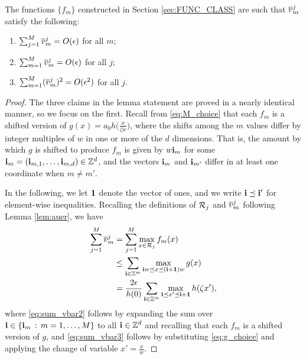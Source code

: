 \documentclass[english,onecolumn,final,11pt]{IEEEtran} %
\begin{document}
\begin{lemma} \label{lem:vbar_sums}
	The functions $\{f_m\}$ constructed in Section \ref{sec:FUNC_CLASS} are such that $\overline{v}_m^j$ satisfy the following:
	\begin{enumerate}
		\item $\sum_{j=1}^M \overline{v}_m^j = O(\epsilon)$ for all $m$;
		\item $\sum_{m=1}^M \overline{v}_m^j = O(\epsilon)$ for all $j$;
		\item $\sum_{m=1}^M (\overline{v}_m^j)^2 = O(\epsilon^2)$ for all $j$.
	\end{enumerate}
\end{lemma}
\begin{proof}
    The three claims in the lemma statement are proved in a nearly identical manner, so we focus on the first.  Recall from \eqref{eq:M_choice} that each $f_m$ is a shifted version of $g(x) = a_0 h\big(\frac{x}{\zeta w}\big)$, where the shifts among the $m$ values differ by integer multiples of $w$ in one or more of the $d$ dimensions.  That is, the amount by which $g$ is shifted to produce $f_m$ is given by $w \mathbf{i}_m$ for some $\mathbf{i}_m = (\mathbf{i}_{m,1},\dotsc,\mathbf{i}_{m,d}) \in \mathbb{Z}^d$, and the vectors $\mathbf{i}_{m}$ and $\mathbf{i}_{m'}$ differ in at least one coordinate when $m \ne m'$.  
    
    In the following, we let $\mathbf{1}$ denote the vector of ones, and we write $\mathbf{i} \preceq \mathbf{i}'$ for element-wise inequalities. Recalling the definitions of $\mathcal{R}_j$ and $\overline{v}_m^j$ following Lemma \ref{lem:auer}, we have
    \begin{align}
        \sum_{j=1}^M \overline{v}_m^j 
            &= \sum_{j=1}^M \max_{x \in \mathcal{R}_j} f_m(x) \\
            &\le \sum_{\mathbf{i} \in \mathbb{Z}^m} \max_{\mathbf{i} w \preceq x \preceq (\mathbf{i}+\mathbf{1})w} g(x) \label{eq:sum_vbar2} \\
            &= \frac{2\epsilon}{h(0)} \sum_{\mathbf{i} \in \mathbb{Z}^m} \max_{\mathbf{i} \preceq x' \preceq \mathbf{i}+\mathbf{1}} h(\zeta x'), \label{eq:sum_vbar3}
    \end{align}
    where \eqref{eq:sum_vbar2} follows by expanding the sum over $\mathbf{i} \in \{\mathbf{i}_m \,:\,m = 1,\dotsc,M\}$ to all $\mathbf{i} \in \mathbb{Z}^d$ and recalling that each $f_m$ is a shifted version of $g$, and \eqref{eq:sum_vbar3} follows by substituting \eqref{eq:g_choice} and applying the change of variable $x' = \frac{x}{w}$.
    

\end{proof}
\end{document}
